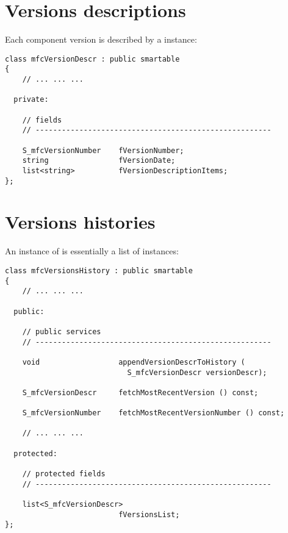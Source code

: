 \section{Versions descriptions}\label{Versions descriptions}

Each component version is described by a  instance:
\begin{lstlisting}[language=CPlusPlus]
class mfcVersionDescr : public smartable
{
	// ... ... ...

  private:

    // fields
    // ------------------------------------------------------

    S_mfcVersionNumber    fVersionNumber;
    string                fVersionDate;
    list<string>          fVersionDescriptionItems;
};
\end{lstlisting}


\section{Versions histories}\label{Versions histories}

An instance of  is essentially a list of  instances:
\begin{lstlisting}[language=CPlusPlus]
class mfcVersionsHistory : public smartable
{
	// ... ... ...

  public:

    // public services
    // ------------------------------------------------------

    void                  appendVersionDescrToHistory (
                            S_mfcVersionDescr versionDescr);

    S_mfcVersionDescr     fetchMostRecentVersion () const;

    S_mfcVersionNumber    fetchMostRecentVersionNumber () const;

	// ... ... ...

  protected:

    // protected fields
    // ------------------------------------------------------

    list<S_mfcVersionDescr>
                          fVersionsList;
};
\end{lstlisting}

